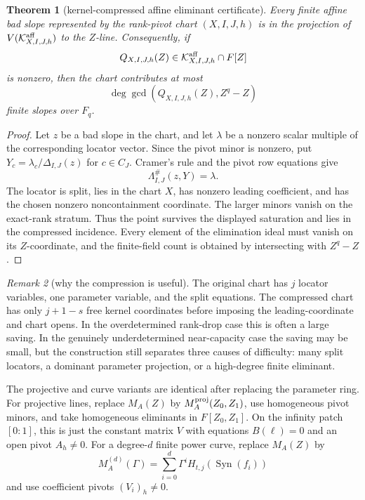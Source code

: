 \documentclass[11pt]{article}
\newtheorem{theorem}{Theorem}[section]
\theoremstyle{definition}
\theoremstyle{remark}
\newtheorem{remark}[theorem]{Remark}
\newcommand{\Syn}{\operatorname{Syn}}
\begin{document}
\begin{theorem}[kernel-compressed affine eliminant certificate]
\label{thm:kernel-compressed-affine-eliminant}
Every finite affine bad slope represented by the rank-pivot chart
$(X,I,J,h)$ is in the projection of
$V(\mathcal K^{\rm aff}_{X,I,J,h})$ to the $Z$-line.  Consequently, if
\[
        Q_{X,I,J,h}(Z)\in
        \mathcal K^{\rm aff}_{X,I,J,h}\cap F[Z]
\]
is nonzero, then the chart contributes at most
\[
        \deg\gcd(Q_{X,I,J,h}(Z),Z^q-Z)
\]
finite slopes over $F_q$.
\end{theorem}

\begin{proof}
Let $z$ be a bad slope in the chart, and let $\lambda$ be a nonzero scalar
multiple of the corresponding locator vector.  Since the pivot minor is nonzero,
put $Y_c=\lambda_c/\Delta_{I,J}(z)$ for $c\in C_J$.  Cramer's rule and the pivot
row equations give
\[
        \Lambda^{\#}_{I,J}(z,Y)=\lambda .
\]
The locator is split, lies in the chart $X$, has nonzero leading coefficient,
and has the chosen nonzero noncontainment coordinate.  The larger minors vanish
on the exact-rank stratum.  Thus the point survives the displayed saturation and
lies in the compressed incidence.  Every element of the elimination ideal must
vanish on its $Z$-coordinate, and the finite-field count is obtained by
intersecting with $Z^q-Z$.
\end{proof}

\begin{remark}[why the compression is useful]
The original chart has $j$ locator variables, one parameter variable, and the
split equations.  The compressed chart has only $j+1-s$ free kernel coordinates
before imposing the leading-coordinate and chart opens.  In the overdetermined
rank-drop case this is often a large saving.  In the genuinely underdetermined
near-capacity case the saving may be small, but the construction still separates
three causes of difficulty: many split locators, a dominant parameter projection,
or a high-degree finite eliminant.
\end{remark}

The projective and curve variants are identical after replacing the parameter
ring.  For projective lines, replace $M_A(Z)$ by
$M_A^{\rm proj}(Z_0,Z_1)$, use homogeneous pivot minors, and take
homogeneous eliminants in $F[Z_0,Z_1]$.  On the infinity patch $[0:1]$, this is
just the constant matrix $V$ with equations $B(\ell)=0$ and an open pivot
$A_h\ne0$.  For a degree-$d$ finite power curve, replace $M_A(Z)$ by
\[
        M_A^{(d)}(\Gamma)=\sum_{i=0}^{d}\Gamma^i
        H_{t,j}(\Syn(f_i))
\]
and use coefficient pivots $(V_i)_h\ne0$.
\end{document}
